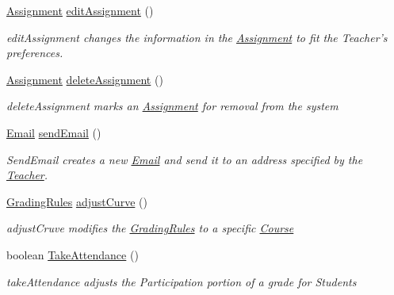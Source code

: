 \begin{CompactItemize}
\hyperlink{classAssignment}{Assignment} \hyperlink{classTeacher_eace6c71e6c487ba11452db814258a3d}{editAssignment} ()
\begin{CompactList}\small\item\em editAssignment changes the information in the \hyperlink{classAssignment}{Assignment} to fit the Teacher's preferences. \item\end{CompactList}\item 
\hyperlink{classAssignment}{Assignment} \hyperlink{classTeacher_6c0a15bb3a1bc765bf9e4159afdc34b2}{deleteAssignment} ()
\begin{CompactList}\small\item\em deleteAssignment marks an \hyperlink{classAssignment}{Assignment} for removal from the system \item\end{CompactList}\item 
\hyperlink{classEmail}{Email} \hyperlink{classTeacher_7092ebe3cf6398d9584a8fd214649a24}{sendEmail} ()
\begin{CompactList}\small\item\em SendEmail creates a new \hyperlink{classEmail}{Email} and send it to an address specified by the \hyperlink{classTeacher}{Teacher}. \item\end{CompactList}\item 
\hyperlink{classGradingRules}{GradingRules} \hyperlink{classTeacher_47598790c6388c6df08c2ce51512cfcd}{adjustCurve} ()
\begin{CompactList}\small\item\em adjustCruve modifies the \hyperlink{classGradingRules}{GradingRules} to a specific \hyperlink{classCourse}{Course} \item\end{CompactList}\item 
boolean \hyperlink{classTeacher_cc54c1c6fbc029a15a50901cfd3e057c}{TakeAttendance} ()
\begin{CompactList}\small\item\em takeAttendance adjusts the Participation portion of a grade for Students \item\end{CompactList}\end{CompactItemize}
